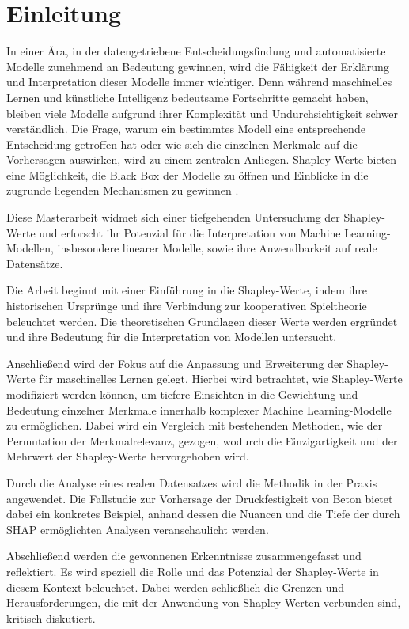 \chapter{Einleitung}

In einer Ära, in der datengetriebene Entscheidungsfindung und automatisierte Modelle zunehmend an Bedeutung gewinnen,
wird die Fähigkeit der Erklärung und Interpretation dieser Modelle immer wichtiger. Denn während maschinelles Lernen und
künstliche Intelligenz bedeutsame Fortschritte gemacht haben, bleiben viele Modelle aufgrund ihrer Komplexität und Undurchsichtigkeit
schwer verständlich. Die Frage, warum ein bestimmtes Modell eine entsprechende Entscheidung getroffen hat oder wie sich die einzelnen
Merkmale auf die Vorhersagen auswirken, wird zu einem zentralen Anliegen. 
Shapley-Werte bieten eine Möglichkeit, die \glqq{}Black Box\grqq{} der Modelle zu öffnen und Einblicke 
in die zugrunde liegenden Mechanismen zu gewinnen \cite[S. 3]{Molnar_2023}. 

Diese Masterarbeit widmet sich einer tiefgehenden Untersuchung der Shapley-Werte und erforscht ihr Potenzial für die Interpretation
von Machine Learning-Modellen, insbesondere linearer Modelle, sowie ihre Anwendbarkeit auf reale Datensätze.

Die Arbeit beginnt mit einer Einführung in die Shapley-Werte, indem ihre historischen Ursprünge 
und ihre Verbindung zur kooperativen Spieltheorie beleuchtet werden. Die theoretischen Grundlagen dieser Werte werden 
ergründet und ihre Bedeutung für die Interpretation von Modellen untersucht.

Anschließend wird der Fokus auf die Anpassung und Erweiterung der Shapley-Werte für maschinelles Lernen gelegt. 
Hierbei wird betrachtet, wie Shapley-Werte modifiziert werden können, um tiefere Einsichten in die Gewichtung 
und Bedeutung einzelner Merkmale innerhalb komplexer Machine Learning-Modelle zu ermöglichen. Dabei wird ein Vergleich 
mit bestehenden Methoden, wie der Permutation der Merkmalrelevanz, gezogen, wodurch die Einzigartigkeit und der Mehrwert der 
Shapley-Werte hervorgehoben wird.

Durch die Analyse eines realen Datensatzes wird die Methodik in der Praxis angewendet. Die Fallstudie zur Vorhersage der 
Druckfestigkeit von Beton bietet dabei ein konkretes Beispiel, anhand dessen die Nuancen und die Tiefe der durch SHAP 
ermöglichten Analysen veranschaulicht werden.

Abschließend werden die gewonnenen Erkenntnisse zusammengefasst und reflektiert. Es wird speziell die Rolle und das 
Potenzial der Shapley-Werte in diesem Kontext beleuchtet. Dabei werden schließlich die Grenzen und Herausforderungen, 
die mit der Anwendung von Shapley-Werten verbunden sind, kritisch diskutiert. 